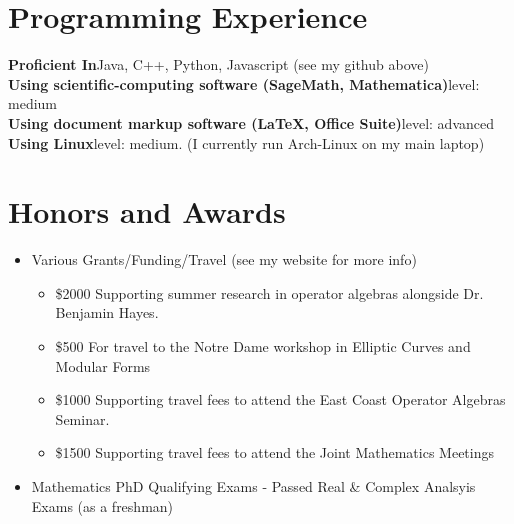 \documentclass[12pt,letterpaper,sans]{moderncv}
\begin{document}
\section{Programming Experience}
\textbf{Proficient In}\quad Java, C++, Python, Javascript (see my github above) \\
\textbf{Using scientific-computing software (SageMath, Mathematica)}\quad level: medium \\
\textbf{Using document markup software (\LaTeX, Office Suite)}\quad level: advanced \\
\textbf{Using Linux}\quad level: medium. (I currently run Arch-Linux on my main laptop)

\section{Honors and Awards}
\begin{itemize}
  \item Various Grants/Funding/Travel (see my website for more info)
  \begin{itemize}
    \item \$2000 Supporting summer research in operator algebras alongside Dr. Benjamin Hayes.
    \item \$500 For travel to the Notre Dame workshop in Elliptic Curves and Modular Forms
    \item \$1000 Supporting travel fees to attend the East Coast Operator Algebras Seminar. 
    \item \$1500 Supporting travel fees to attend the Joint Mathematics Meetings
  \end{itemize}
  \item Mathematics PhD Qualifying Exams - Passed Real \& Complex Analsyis Exams (as a freshman)


  
\end{itemize}
\end{document}
